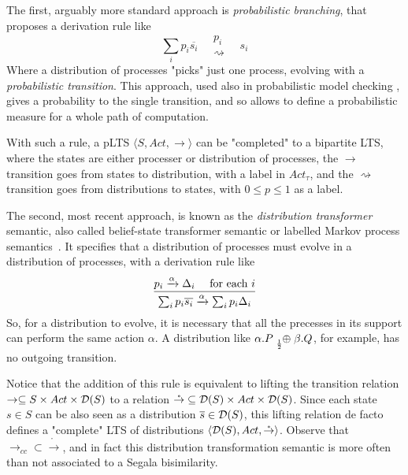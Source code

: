 The first, arguably more standard approach is \textit{probabilistic branching}, that proposes a derivation rule like
\[ \sum_i p_i \overline{s_i} \quad
\substack{  p_i  \\  \rightsquigarrow } 
\quad s_i \]
Where a distribution of processes "picks" just one process, evolving with a \textit{probabilistic transition}. This approach, used also in probabilistic model checking \cite{kwiatkowskaPRISMVerificationProbabilistic2011}, gives a probability to the single transition, and so allows to define a probabilistic measure for a whole path of computation.

With such a rule, a pLTS $\langle S, Act, \rightarrow\rangle$ can be "completed" to a bipartite LTS, where the states are either processer or distribution of processes, the $\rightarrow$ transition goes from states to distribution, with a label in $Act_\tau$, and the $\rightsquigarrow$ transition goes from distributions to states, with $0 \leq p \leq 1$ as a label. 

The second, most recent approach, is known as the \textit{distribution transformer} semantic, also called belief-state transformer semantic or labelled Markov process semantics~\cite{desharnaisBisimulationLabelledMarkov2002, korthikantiReasoningMDPsTransformers2010,  hermannsProbabilisticBisimulationNaturally2014}. It specifies that a distribution of processes must evolve in a distribution of processes, with a derivation rule like 
\[ \infer{ \sum_i p_i \overline{s_i} \xrightarrow{\alpha} \sum_i p_i \Delta_i}
  { p_i \xrightarrow{\alpha} \Delta_i & \text{ for each  }i }
\]
So, for a distribution to evolve, it is necessary that all the precesses in its support can perform the same action $\alpha$. A distribution like $\alpha.P \psum{\frac{1}{2}} \beta.Q$, for example, has no outgoing transition.

Notice that the addition of this rule is equivalent to lifting the transition relation $\rightarrow \subseteq S \times Act \times \mathcal{D}(S)$ to a relation $\mathring{\rightarrow} \subseteq \mathcal{D}(S) \times Act \times \mathcal{D}(S)$. Since each state $s \in S$ can be also seen as a distribution $\overline{s} \in \mathcal{D}(S)$, this lifting relation de facto defines a "complete" LTS of distributions $\langle \mathcal{D}(S), Act, \mathring{\rightarrow}\rangle$. Observe that $\rightarrow_{cc} \subset \mathring{\rightarrow}$, and in fact this distribution transformation semantic is more often than not associated to a Segala bisimilarity.




